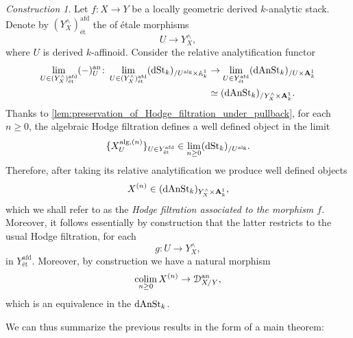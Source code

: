 \documentclass[10pt,a4paper,reqno]{amsart} %
\theoremstyle{plain}
\theoremstyle{definition}
\theoremstyle{remark}
\numberwithin{equation}{section}
\newtheorem{construction}[thm]{Construction}
\begin{document}
\begin{construction} Let $f \colon X \to Y$ be a locally geometric derived $k$-analytic stack. Denote by $(Y^\wedge_X)^\mathrm{afd}_\textrm{\'et}$ the \infcat
    of \'etale morphisms
        \[
            U \to Y^\wedge_X,  
        \]
    where $U$ is derived $k$-affinoid.
    Consider the relative analytification functor
        \begin{align*}
            \lim_{U \in (Y^\wedge_X)^\mathrm{afd}_\textrm{\'et}} (-)^\mathrm{an}_U \colon\lim_{U \in (Y^\wedge_X)^{\mathrm{afd}}_{\textrm{\'et}}} (\mathrm{dSt}_k)_{/ U^\mathrm{alg} \times \mathbb A^1_k} & \to \lim_{U \in Y^{\mathrm{afd}}_\textrm{\'et}} (\mathrm{dAnSt}_k)_{/ U \times \mathbf A^1_k}  \\
                                                                                                                                                                            & \simeq (\mathrm{dAnSt}_k)_{/ Y^\wedge_X \times \mathbf A^1_k}.
        \end{align*}
    Thanks to \cref{lem:preservation_of_Hodge_filtration_under_pullback}, for each $n \ge 0$, the algebraic Hodge filtration defines a well defined object in the limit
        \[
            \{ X^{\mathrm{alg}, (n)}_{U} \}_{U \in Y^\mathrm{afd}_\textrm{\'et}}  \in \lim_{n \ge 0} (\mathrm{dSt}_k)_{/ U^\mathrm{alg}}.
        \]
    Therefore, after taking its relative analytification we produce well defined objects 
        \[X^{(n)} \in (\mathrm{dAnSt}_k)_{Y^\wedge_X \times \mathbf A^1_k},\]
    which we shall refer to as the \emph{Hodge filtration associated to the morphism $f$}.
    Moreover, 
    it follows essentially by construction that the latter restricts to the usual
    Hodge filtration, for each
        \[
            g \colon U \to Y^\wedge_X,  
        \]
    in $Y^\mathrm{afd}_\textrm{\'et}$. Moreover, by construction we have a natural morphism
        \[
            \operatorname*{colim}_{n \ge 0} X^{(n)} \to \mathcal D_{X/ Y} ^\mathrm{an},  
        \]
    which is an equivalence in the \infcat $\mathrm{dAnSt}_k$.
\end{construction}

We can thus summarize the previous results in the form of a main theorem:
\end{document}
